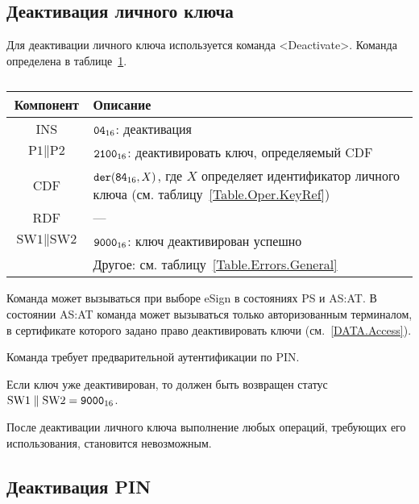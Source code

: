 \subsection{Деактивация личного ключа}
\label{Oper.Descr.DeactivateKey} 

Для деактивации личного ключа используется команда <Deactivate>.
Команда определена в таблице~\ref{Table.Oper.DeactivateKeyCmd}.

\begin{table}[hbt]
\caption{}\label{Table.Oper.DeactivateKeyCmd}
\begin{tabular}{|c|p{14cm}|}
\hline
Компонент & Описание\\
\hline
\hline
INS & $\texttt{04}_{16}$: деактивация\\
\hline
$\text{P1} \parallel \text{P2}$ & $\texttt{2100}_{16}$: 
деактивировать ключ, определяемый CDF\\
\hline
CDF &  $\texttt{der}(\texttt{84}_{16}, X)$,   
где $X$ определяет идентификатор личного ключа 
(см. таблицу~\ref{Table.Oper.KeyRef})\\
\hline 
\hline
RDF & --- \\
\hline
$\text{SW1} \parallel \text{SW2}$ & 
$\texttt{9000}_{16}$: ключ деактивирован успешно \\
\cline{2-2}
  & Другое: см. таблицу~\ref{Table.Errors.General} \\
\hline
\end{tabular}
\end{table}

Команда может вызываться при выборе eSign в состояниях 
PS и AS:AT. В состоянии AS:AT команда может вызываться 
только авторизованным терминалом, в сертификате которого задано право
деактивировать ключи (см.~\ref{DATA.Access}).

Команда требует предварительной аутентификации по PIN. 

Если ключ уже деактивирован, то должен быть возвращен статус
$\text{SW1} \parallel \text{SW2} = \texttt{9000}_{16}$.

После деактивации личного ключа выполнение любых операций, 
требующих его использования, становится невозможным.

\subsection{Деактивация PIN}
\label{Oper.Descr.DeactivatePIN} 

